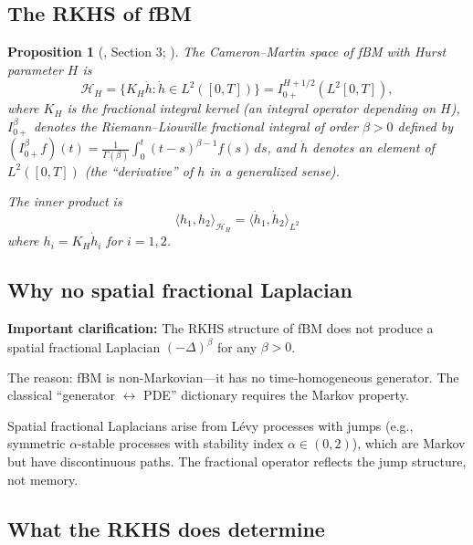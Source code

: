 \documentclass[12pt]{article}
\theoremstyle{plain}
\newtheorem{proposition}[theorem]{Proposition}
\theoremstyle{definition}
\theoremstyle{remark}
\newcommand{\HH}{\mathcal{H}}
\begin{document}
\subsection{The RKHS of fBM}

\begin{proposition}[{\cite{Fontes2026b}, Section 3; \cite{PipirasTaqqu2017}}]\label{prop:fBM-RKHS}
The Cameron--Martin space of fBM with Hurst parameter $H$ is
\begin{equation}\label{eq:fBM-CM-space}
\HH_H = \{K_H \dot{h} : \dot{h} \in L^2([0,T])\} = I_{0+}^{H+1/2}(L^2[0,T]),
\end{equation}
where $K_H$ is the fractional integral kernel (an integral operator depending on $H$), $I_{0+}^{\beta}$ denotes the Riemann--Liouville fractional integral of order $\beta > 0$ defined by $(I_{0+}^{\beta} f)(t) = \frac{1}{\Gamma(\beta)} \int_0^t (t-s)^{\beta - 1} f(s) \, ds$, and $\dot{h}$ denotes an element of $L^2([0,T])$ (the ``derivative'' of $h$ in a generalized sense).

The inner product is
\begin{equation}\label{eq:fBM-CM-inner-product}
\langle h_1, h_2 \rangle_{\HH_H} = \langle \dot{h}_1, \dot{h}_2 \rangle_{L^2}
\end{equation}
where $h_i = K_H \dot{h}_i$ for $i = 1, 2$.
\end{proposition}

\subsection{Why no spatial fractional Laplacian}

\textbf{Important clarification:} The RKHS structure of fBM does not produce a spatial fractional Laplacian $(-\Delta)^{\beta}$ for any $\beta > 0$.

The reason: fBM is non-Markovian---it has no time-homogeneous generator. The classical ``generator $\leftrightarrow$ PDE'' dictionary requires the Markov property.

Spatial fractional Laplacians arise from L\'{e}vy processes with jumps (e.g., symmetric $\alpha$-stable processes with stability index $\alpha \in (0,2)$), which are Markov but have discontinuous paths. The fractional operator reflects the jump structure, not memory.

\subsection{What the RKHS does determine}
\end{document}
